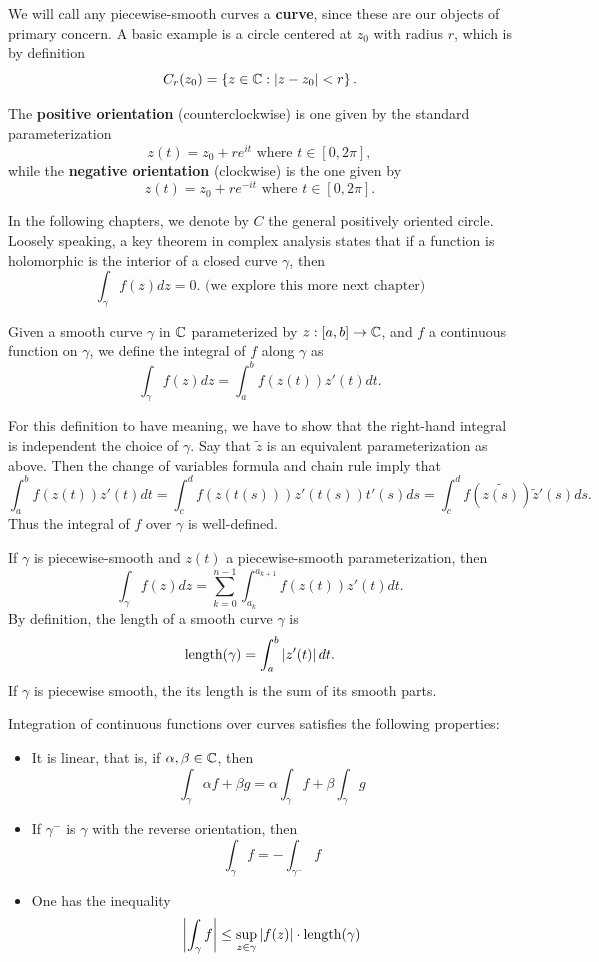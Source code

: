 \documentclass{exam}
\begin{document}
We will call any piecewise-smooth curves a \textbf{curve}, since these are our objects of primary concern. A basic example is a circle
centered at $z_0$ with radius $r$, which is by definition
$$C_r(z_0) = \left \{ z\in\mathbb{C} : |z - z_0| < r \right \}.$$

The \textbf{positive orientation} (counterclockwise) is one given by the standard parameterization
$$z(t) = z_0 + re^{it}\text{ where } t\in[0, 2\pi],$$
while the \textbf{negative orientation} (clockwise) is the one given by 
$$z(t) = z_0 + re^{-it}\text{ where } t\in[0, 2\pi].$$

In the following chapters, we denote by $C$ the general positively oriented circle. Loosely speaking, a key theorem in complex analysis
states that if a function is holomorphic is the interior of a closed curve $\gamma$, then
$$\int_\gamma f(z) dz = 0. \text{ (we explore this more next chapter)}$$

Given a smooth curve $\gamma$ in $\mathbb{C}$ parameterized by $z: [a, b]\to \mathbb{C}$, and $f$ a continuous function on $\gamma$, we define the integral
of $f$ along $\gamma$ as
$$\int_\gamma f(z)dz = \int_a^b f(z(t))z'(t)dt.$$

For this definition to have meaning, we have to show that the right-hand integral is independent the choice of $\gamma$. Say that $\tilde{z}$
is an equivalent parameterization as above. Then the change of variables formula and chain rule imply that
$$\int_a^b f(z(t))z'(t)dt = \int_c^d f(z(t(s)))z'(t(s))t'(s)ds = \int_c^d f(\tilde{z(s)})\tilde{z}'(s)ds.$$
Thus the integral of $f$ over $\gamma$ is well-defined.

If $\gamma$ is piecewise-smooth and $z(t)$ a piecewise-smooth parameterization, then
$$\int_\gamma f(z) dz = \sum_{k = 0}^{n - 1}\int_{a_k}^{a_{k + 1}} f(z(t))z'(t)dt. $$
By definition, the length of a smooth curve $\gamma$ is 
$$\text{length}(\gamma) = \int_a^b \left| z'(t) \right|dt. $$
If $\gamma$ is piecewise smooth, the its length is the sum of its smooth parts.

\noqed
\begin{proposition}
    Integration of continuous functions over curves satisfies the following properties:
    \begin{itemize}
        \item It is linear, that is, if $\alpha, \beta\in\mathbb{C}$, then
        $$\int_\gamma \alpha f + \beta g = \alpha \int_\gamma f + \beta \int_\gamma g$$

        \item If $\gamma^-$ is $\gamma$ with the reverse orientation, then
        $$\int_\gamma f = -\int_{\gamma^-} f$$

        \item One has the inequality
        $$\left| \int_\gamma f \right| \leq \sup_{z\in\gamma} \left| f(z) \right|\cdot\text{length}(\gamma)$$
    \end{itemize}
\end{proposition}
\yesqed
\end{document}
